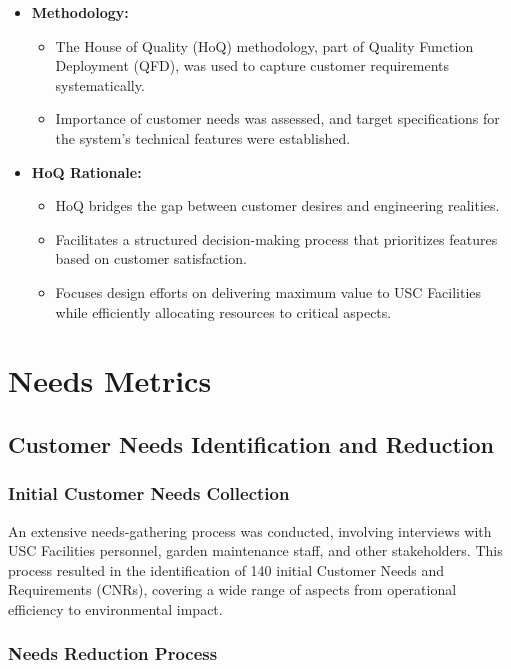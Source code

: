\documentclass[12pt]{report}
\begin{document}
\begin{itemize}
    \item \textbf{Methodology:}
    \begin{itemize}
        \item The House of Quality (HoQ) methodology, part of Quality Function Deployment (QFD), was used to capture customer requirements systematically.
        \item Importance of customer needs was assessed, and target specifications for the system's technical features were established.
    \end{itemize}
    
    \item \textbf{HoQ Rationale:}
    \begin{itemize}
        \item HoQ bridges the gap between customer desires and engineering realities.
        \item Facilitates a structured decision-making process that prioritizes features based on customer satisfaction.
        \item Focuses design efforts on delivering maximum value to USC Facilities while efficiently allocating resources to critical aspects.
    \end{itemize}
\end{itemize}


\section{Needs Metrics}

\subsection{Customer Needs Identification and Reduction}

\subsubsection{Initial Customer Needs Collection}

An extensive needs-gathering process was conducted, involving interviews with USC Facilities personnel, garden maintenance staff, and other stakeholders. This process resulted in the identification of 140 initial Customer Needs and Requirements (CNRs), covering a wide range of aspects from operational efficiency to environmental impact.

\subsubsection{Needs Reduction Process}
\end{document}
